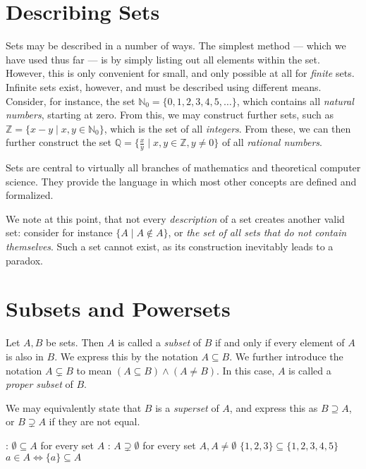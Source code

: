 \section{Describing Sets}
Sets may be described in a number of ways.
The simplest method --- which we have used thus far --- is by simply listing out
all elements within the set.
However, this is only convenient for small, and only possible at all for
\emph{finite} sets.
Infinite sets exist, however, and must be described using different means.
Consider, for instance, the set \(\mathbb{N}_{0} = \{0,1,2,3,4,5,\dots\}\),
which contains all \emph{natural numbers}, starting at zero.
From this, we may construct further sets, such as
\(\mathbb{Z} = \{x-y \mid x, y \in \mathbb{N}_0\}\), which is the set of all
\emph{integers}.
From these, we can then further construct the set
\(\mathbb{Q} = \{\frac{x}{y} \mid x,y \in \mathbb{Z}, y \neq 0\}\) of all
\emph{rational numbers}.

Sets are central to virtually all branches of mathematics and theoretical
computer science. They provide the language in which most other concepts are
defined and formalized.

We note at this point, that not every \emph{description} of a set creates
another valid set: consider for instance \(\{A \mid A \notin A\}\), or \emph{the
set of all sets that do not contain themselves}. Such a set cannot exist, as its
construction inevitably leads to a paradox.

\section{Subsets and Powersets}

Let \(A, B\) be sets. Then \(A\) is called a \emph{subset} of \(B\) if and only if
every element of \(A\) is also in \(B\). We express this by the notation
\(A \subseteq B\). We further introduce the notation \(A \subsetneq B\) to mean
\((A \subseteq B) \land (A \neq B)\). In this case, \(A\) is called a \emph{proper
  subset} of \(B\).

We may equivalently state that \(B\) is a \emph{superset} of \(A\), and express
this as \(B \supseteq A\), or \(B \supsetneq A\) if they are not equal.

\begin{example}
  \begin{itemize}
    \leavevmode
    :
          \(\emptyset \subseteq A\) for every set \(A\)
    :
          \(A \supsetneq \emptyset\) for every set \(A, A\neq\emptyset\)
    \ii{} \(\{1,2,3\} \subseteq \{1,2,3,4,5\}\)
    \ii{} \(a \in A \Leftrightarrow \{a\} \subseteq A\)
  \end{itemize}
\end{example}


